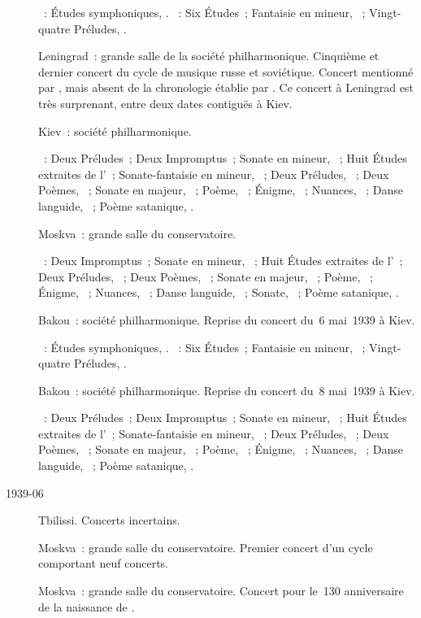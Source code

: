 \begin{description}
 \textsc{\Schumann{}}~: Études symphoniques, .
 \textsc{\Chopin{}}~: Six Études~; Fantaisie en \kF mineur, ~;
 Vingt-quatre Préludes, .
 \item[\DateWithWeekDay{1939-05-07}]
 Leningrad~: grande salle de la société philharmonique.
 Cinquième et dernier concert du cycle de musique russe et soviétique.
 Concert mentionné par \citet[p.~160]{Nekrasova08}, mais absent de la
 chronologie établie par \citet[p.~414]{Scriabine}.
 Ce concert à Leningrad est très surprenant, entre deux dates contiguës à
 Kiev.
 \item[\DateWithWeekDay{1939-05-08}]
 Kiev~: société philharmonique.

 \textsc{\Scriabine{}}~: Deux Préludes~; Deux Impromptus~; Sonate en \kF
 \Sharp mineur, ~; Huit Études extraites de l'~;
 Sonate-fantaisie en \kG \Sharp mineur, ~; Deux Préludes,
 ~; Deux Poèmes, ~; Sonate en \kF \Sharp majeur,
 ~; Poème,  ~; Énigme,  ~;
 Nuances,  ~; Danse languide,  ~;
 Poème satanique, .
 \item[\DateWithWeekDay{1939-05-18}]
 Moskva~: grande salle du conservatoire.

 \textsc{\Scriabine{}}~: Deux Impromptus~; Sonate en \kF \Sharp mineur,
 ~; Huit Études extraites de l'~; Deux Préludes,
 ~; Deux Poèmes, ~; Sonate en \kF \Sharp majeur,
 ~; Poème,  ~; Énigme,  ~;
 Nuances,  ~; Danse languide,  ~;
 Sonate, ~; Poème satanique, .
 \item[\DateWithWeekDay{1939-05-24}]
 Bakou~: société philharmonique.
 Reprise du concert du~6 mai~1939 à Kiev.

 \textsc{\Schumann{}}~: Études symphoniques, .
 \textsc{\Chopin{}}~: Six Études~; Fantaisie en \kF mineur, ~;
 Vingt-quatre Préludes, .
 \item[\DateWithWeekDay{1939-05-26}]
 Bakou~: société philharmonique.
 Reprise du concert du~8 mai~1939 à Kiev.

 \textsc{\Scriabine{}}~: Deux Préludes~; Deux Impromptus~; Sonate en \kF
 \Sharp mineur, ~; Huit Études extraites de l'~;
 Sonate-fantaisie en \kG \Sharp mineur, ~; Deux Préludes,
 ~; Deux Poèmes, ~; Sonate en \kF \Sharp majeur,
 ~; Poème,  ~; Énigme,  ~;
 Nuances,  ~; Danse languide,  ~;
 Poème satanique, .
 \item[1939-06]
 Tbilissi.
 Concerts incertains.
 \item[\DateWithWeekDay{1939-09-15}]
 Moskva~: grande salle du conservatoire.
 Premier concert d'un cycle \Chopin{} comportant neuf concerts.
 \item[\DateWithWeekDay{1939-10-09}]
 Moskva~: grande salle du conservatoire.
 Concert pour le~130\ieme{} anniversaire de la naissance de \Schumann{}.


\end{description}
